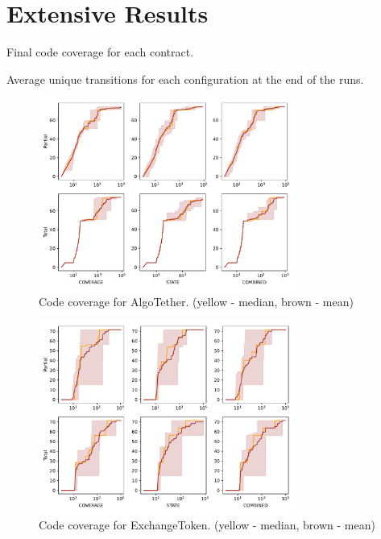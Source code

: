 
\chapter{Extensive Results}\label{chapter:extensive-results}

\begin{table}[htbp]
    \centering
    \caption{Final code coverage for each contract.}\label{table:covs}
\end{table}

\begin{table}[htbp]
    \centering
    \caption{Average unique transitions for each configuration at the end of the runs.}\label{table:trans}
\end{table}


\begin{figure}[htbp]
    \centering
    \includegraphics*[width=0.75\textwidth]{charts/AlgoTether_range.pdf}
    \caption{Code coverage for AlgoTether. (yellow - median, brown - mean)}
    \label{fig:AlgoTether range}
\end{figure}


\begin{figure}[htbp]
    \centering
    \includegraphics*[width=0.75\textwidth]{charts/ExchangeToken_range.pdf}
    \caption{Code coverage for ExchangeToken. (yellow - median, brown - mean)}
    \label{fig:ExchangeToken range}
\end{figure}



